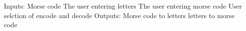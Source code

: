 Inputs\+: Morse code The user entering letters The user entering morse code User selction of encode and decode Outputs\+: Morse code to letters letters to morse code 